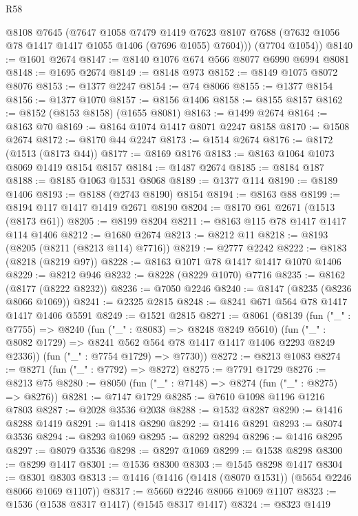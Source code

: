 \begin{lexlean}{R58}
\begin{coremodule}
{{        @8108
        @7645
        (@7647
          @1058
          @7479
          @1419
          @7623
          @8107
          @7688
          (@7632 @1056 @78 @1417 @1417 @1055 @1406 (@7696 @1055) @7604)))
      (@7704 @1054))
@8140 := @1601 @2674
@8147 := @8140 @1076 @674 @566 @8077 @6990 @6994 @8081
@8148 := @1695 @2674
@8149 := @8148 @973
@8152 := @8149 @1075 @8072 @8076
@8153 := @1377 @2247
@8154 := @74 @8066
@8155 := @1377 @8154
@8156 := @1377 @1070
@8157 := @8156 @1406
@8158 := @8155 @8157
@8162 := @8152 (@8153 @8158) (@1655 @8081)
@8163 := @1499 @2674
@8164 := @8163 @70
@8169 := @8164 @1074 @1417 @8071 @2247 @8158
@8170 := @1508 @2674
@8172 := @8170 @44 @2247
@8173 := @1514 @2674
@8176 := @8172 (@1513 (@8173 @44))
@8177 := @8169 @8176
@8183 := @8163 @1064 @1073 @8069 @1419 @8154 @8157
@8184 := @1487 @2674
@8185 := @8184 @187
@8188 := @8185 @1063 @1531 @8068
@8189 := @1377 @114
@8190 := @8189 @1406
@8193 := @8188 (@2743 @8190) @8154
@8194 := @8163 @88
@8199 := @8194 @117 @1417 @1419 @2671 @8190
@8204 := @8170 @61 @2671 (@1513 (@8173 @61))
@8205 := @8199 @8204
@8211 := @8163 @115 @78 @1417 @1417 @114 @1406
@8212 := @1680 @2674
@8213 := @8212 @11
@8218 := @8193 (@8205 (@8211 (@8213 @114) @7716))
@8219 := @2777 @2242
@8222 := @8183 (@8218 (@8219 @97))
@8228 := @8163 @1071 @78 @1417 @1417 @1070 @1406
@8229 := @8212 @946
@8232 := @8228 (@8229 @1070) @7716
@8235 := @8162 (@8177 (@8222 @8232))
@8236 := @7050 @2246
@8240 := @8147 (@8235 (@8236 @8066 @1069))
@8241 := @2325 @2815
@8248 := @8241 @671 @564 @78 @1417 @1417 @1406 @5591
@8249 := @1521 @2815
@8271 := @8061
    (@8139
      (fun ("_" : @7755) =>
      @8240
        (fun ("_" : @8083) => @8248 @8249 @5610)
        (fun ("_" : @8082 @1729) => @8241 @562 @564 @78 @1417 @1417 @1406 @2293 @8249 @2336))
      (fun ("_" : @7754 @1729) => @7730))
@8272 := @8213 @1083
@8274 := @8271 (fun ("_" : @7792) => @8272)
@8275 := @7791 @1729
@8276 := @8213 @75
@8280 := @8050 (fun ("_" : @7148) => @8274 (fun ("_" : @8275) => @8276))
@8281 := @7147 @1729
@8285 := @7610 @1098 @1196 @1216 @7803
@8287 := @2028 @3536 @2038
@8288 := @1532 @8287
@8290 := @1416 @8288 @1419
@8291 := @1418 @8290
@8292 := @1416 @8291
@8293 := @8074 @3536
@8294 := @8293 @1069
@8295 := @8292 @8294
@8296 := @1416 @8295
@8297 := @8079 @3536
@8298 := @8297 @1069
@8299 := @1538 @8298
@8300 := @8299 @1417
@8301 := @1536 @8300
@8303 := @1545 @8298 @1417
@8304 := @8301 @8303
@8313 := @1416 (@1416 (@1418 (@8070 @1531)) (@5654 @2246 @8066 @1069 @1107))
@8317 := @5660 @2246 @8066 @1069 @1107
@8323 := @1536 (@1538 @8317 @1417) (@1545 @8317 @1417)
@8324 := @8323 @1419
}}
\end{coremodule}
\end{lexlean}
